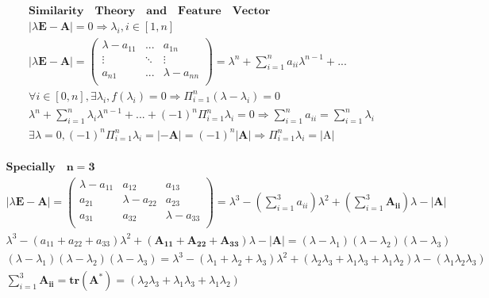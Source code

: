 \documentclass{article}
\begin{document}
\begin{align*}
    \bm{Similarity \quad Theory \quad and \quad Feature \quad Vector} \\ 
    |\lambda\mathbf{E}-\mathbf{A}| = 0 \Rightarrow \lambda_{i},i \in [1,n] \\ 
    |\lambda\mathbf{E}-\mathbf{A}| = \left( 
        \begin{array}{ccc}
            \lambda-a_{11} & ... & a_{1n} \\  
            \vdots & \ddots & \vdots \\ 
            a_{n1} & ... & \lambda-a_{nn} \\ 
        \end{array}  
    \right) = \lambda^{n}+\sum_{i=1}^{n}a_{ii}\lambda^{n-1}+...\\ 
    \forall i\in [0,n],\exists \lambda_{i},f(\lambda_{i})=0 \Longrightarrow \Pi_{i=1}^{n}(\lambda-\lambda_{i}) = 0 \\ 
    \lambda^{n}+\sum_{i=1}^{n}\lambda_{i}\lambda^{n-1}+...+ (-1)^{n}\Pi_{i=1}^{n}\lambda_{i} = 0 \Rightarrow \sum_{i=1}^{n}a_{ii} = \sum_{i=1}^{n}\lambda_{i} \\
    \exists \lambda = 0, (-1)^{n}\Pi_{i=1}^{n}\lambda_{i}=|-\mathbf{A}|=(-1)^{n}|\mathbf{A}| \Rightarrow\Pi_{i=1}^{n}\lambda_{i} = |\mathrm{A}| \\ 
\end{align*}

\begin{align*}
    \bm{Specially \quad n = 3} \\ 
    |\lambda\mathbf{E}-\mathbf{A}| = \left( 
        \begin{array}{ccc}
            \lambda-a_{11} & a_{12} & a_{13} \\  
            a_{21} & \lambda-a_{22} & a_{23}  \\ 
            a_{31} & a_{32} & \lambda-a_{33} \\ 
        \end{array}  
    \right) = \lambda^{3}-\left(\sum_{i=1}^{3}a_{ii}\right)\lambda^{2}+\left(\sum_{i=1}^{3}\mathbf{A_{ii}}\right)\lambda-|\mathbf{A}|\\
    \lambda^{3}-(a_{11}+a_{22}+a_{33})\lambda^{2}+(\mathbf{A_{11}}+\mathbf{A_{22}}+\mathbf{A_{33}})\lambda-|\mathbf{A}| = (\lambda-\lambda_{1})(\lambda-\lambda_{2})(\lambda-\lambda_{3}) \\ 
    (\lambda-\lambda_{1})(\lambda-\lambda_{2})(\lambda-\lambda_{3}) = \lambda^{3}-(\lambda_{1}+\lambda_{2}+\lambda_{3})\lambda^{2}+(\lambda_{2}\lambda_{3}+\lambda_{1}\lambda_{3}+\lambda_{1}\lambda_{2})\lambda-(\lambda_{1}\lambda_{2}\lambda_{3}) \\ 
    \sum_{i=1}^{3}\mathbf{A_{ii}} = \mathbf{tr}(\mathbf{A}^{*}) = (\lambda_{2}\lambda_{3}+\lambda_{1}\lambda_{3}+\lambda_{1}\lambda_{2})\\ 
\end{align*}
\end{document}
